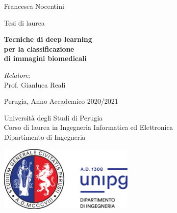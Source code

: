 \documentclass[12pt,a4paper]{report}
\begin{document}
\begin{titlepage}

{\Large \noindent Francesca Nocentini} \newline
                                        \newline
                                        \newline

{\Large \noindent Tesi di laurea}
\vspace{1cm}

{\begin{flushleft}
\fontsize{21.8}{26.16} \selectfont \bfseries \noindent 
Tecniche di deep learning \\
per la classificazione \\
di immagini biomedicali
\end{flushleft}}

\vspace{6mm}

{\large \noindent \emph{Relatore}: \vspace{1.0mm}\\ 
Prof. Gianluca Reali \newline}

\vspace{5cm}


\noindent Perugia, Anno Accademico 2020/2021 

\noindent Università degli Studi di Perugia \\
Corso di laurea in Ingegneria Informatica ed Elettronica \\
Dipartimento di Ingegneria

\vspace{0.7cm}

\noindent \includegraphics[width=0.5\textwidth]{Figures/logounipg2021.png}
\restoregeometry
\end{titlepage}
\normalfont
\newpage \thispagestyle{empty} \ \newpage
\onehalfspacing
\tableofcontents
\end{document}
